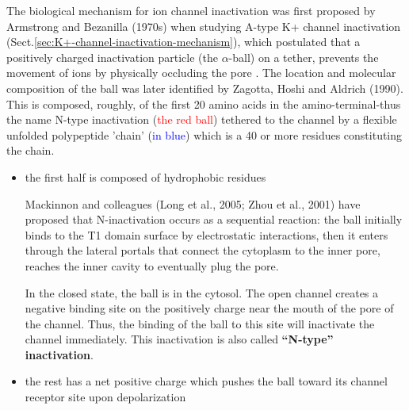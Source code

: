 The biological mechanism for ion channel inactivation was first proposed by
Armstrong and Bezanilla (1970s) when studying A-type K+ channel inactivation
(Sect.\ref{sec:K+-channel-inactivation-mechanism}), which postulated that a
positively charged inactivation particle (the $\alpha$-ball) on a tether,
prevents the movement of ions by physically occluding the pore
\citep{armstrong1973crm}. The location and molecular composition of the ball was
later identified by Zagotta, Hoshi and Aldrich (1990).
This is composed, roughly, of the first 20 amino acids in the
amino-terminal-thus the name N-type inactivation (\textcolor{red}{the red
ball}) tethered to the channel by a flexible unfolded polypeptide 'chain'
(\textcolor{blue}{in blue}) which is a 40 or more residues constituting the
chain.
\begin{itemize}
  \item  the first half is composed of hydrophobic
residues
   
Mackinnon and colleagues (Long et al., 2005; Zhou et al., 2001) have proposed
that N-inactivation occurs as a sequential reaction: the ball initially binds to
the T1 domain surface by electrostatic interactions, then it enters through the
lateral portals that connect the cytoplasm to the inner pore, reaches the inner
cavity to eventually plug the pore.


In the closed state, the ball is in the cytosol. The open channel creates a
negative binding site on the positively charge near the mouth of the pore of the
channel. Thus, the binding of the ball to this site will inactivate the channel
immediately. This inactivation is also called {\bf ``N-type'' inactivation}.
   
   \item the rest has a net positive charge which pushes the ball
toward its channel receptor site upon depolarization  
\end{itemize}


